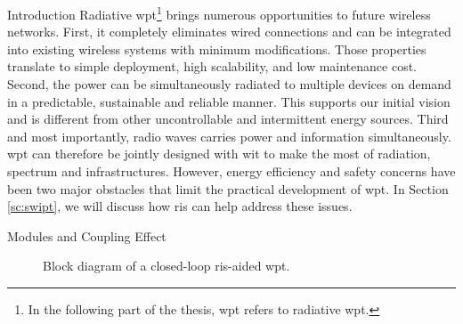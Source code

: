 \begin{section}{}
\begin{subsection}{Introduction}
		Radiative \gls{wpt}\footnote{In the following part of the thesis, \gls{wpt} refers to radiative \gls{wpt}.} brings numerous opportunities to future wireless networks.
		First, it completely eliminates wired connections and can be integrated into existing wireless systems with minimum modifications.
		Those properties translate to simple deployment, high scalability, and low maintenance cost.
		Second, the power can be simultaneously radiated to multiple devices on demand in a predictable, sustainable and reliable manner.
		This supports our initial vision and is different from other uncontrollable and intermittent energy sources.
		Third and most importantly, radio waves carries power and information simultaneously.
		\gls{wpt} can therefore be jointly designed with \gls{wit} to make the most of radiation, spectrum and infrastructures.
		However, energy efficiency and safety concerns have been two major obstacles that limit the practical development of \gls{wpt}.
		In Section \ref{sc:swipt}, we will discuss how \gls{ris} can help address these issues.
	\end{subsection}

	\begin{subsection}{Modules and Coupling Effect}
		\begin{figure}[H]
			\centering
			\resizebox{\columnwidth}{!}{
				
			}
			\caption{Block diagram of a closed-loop \gls{ris}-aided \gls{wpt}.}
			\label{fg:wpt_architecture}
		\end{figure}


\end{subsection}
\end{section}
